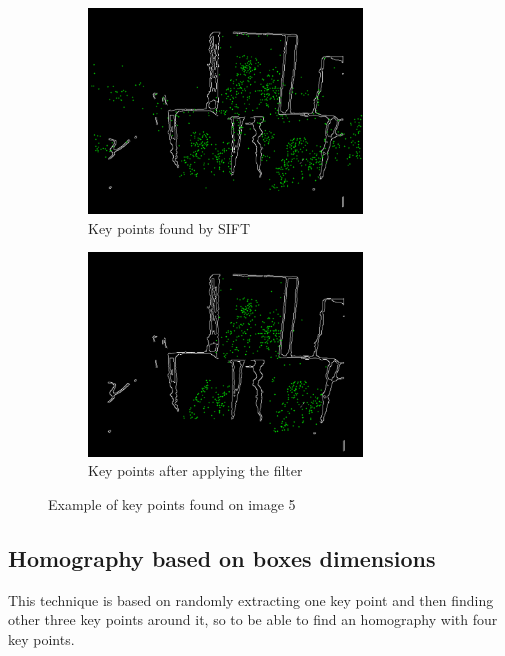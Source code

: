 \documentclass{article}
\begin{document}
\begin{figure}[H]
    \begin{subfigure}[b]{0.5\textwidth}
        \centering
        \includegraphics[width=0.8\textwidth]{image/allKeypointsSIFT.png}
        \caption{Key points found by SIFT}
    \end{subfigure}
    \begin{subfigure}[b]{0.5\textwidth}
        \centering
        \includegraphics[width=0.8\textwidth]{image/KeypointsByRectangles.png}
        \caption{Key points after applying the filter}
    \end{subfigure}
    \caption{Example of key points found on image 5}
    
\end{figure}

\subsection{Homography based on boxes dimensions}
This technique is based on randomly extracting one key point and then finding other three key points around it, so to be able to find an homography with four key points.
\end{document}
